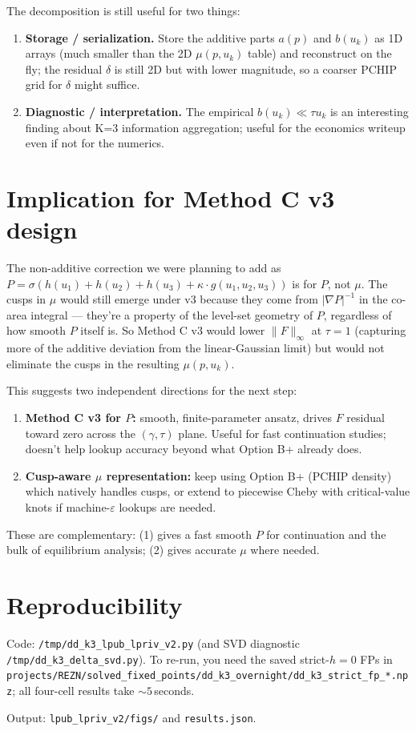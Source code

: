 \documentclass[11pt]{article}
\begin{document}
The decomposition is still useful for two things:
\begin{enumerate}\itemsep1pt
  \item \textbf{Storage / serialization.} Store the additive parts
        $a(p)$ and $b(u_k)$ as 1D arrays (much smaller than the 2D
        $\mu(p, u_k)$ table) and reconstruct on the fly; the
        residual $\delta$ is still 2D but with lower magnitude, so
        a coarser PCHIP grid for $\delta$ might suffice.
  \item \textbf{Diagnostic / interpretation.} The empirical
        $b(u_k) \ll \tau u_k$ is an interesting finding about K=3
        information aggregation; useful for the economics writeup
        even if not for the numerics.
\end{enumerate}

\section{Implication for Method C v3 design}

The non-additive correction we were planning to add as
$P = \sigma(h(u_1) + h(u_2) + h(u_3) + \kappa \cdot g(u_1, u_2, u_3))$
is for $P$, not $\mu$. The cusps in $\mu$ would still emerge under
v3 because they come from $|\nabla P|^{-1}$ in the co-area integral
--- they're a property of the level-set geometry of $P$, regardless
of how smooth $P$ itself is. So Method C v3 would lower
$\|F\|_\infty$ at $\tau = 1$ (capturing more of the additive
deviation from the linear-Gaussian limit) but would not eliminate
the cusps in the resulting $\mu(p, u_k)$.

This suggests two independent directions for the next step:
\begin{enumerate}\itemsep1pt
  \item \textbf{Method C v3 for $P$:} smooth, finite-parameter
        ansatz, drives $F$ residual toward zero across the
        $(\gamma, \tau)$ plane. Useful for fast continuation
        studies; doesn't help lookup accuracy beyond what
        Option B+ already does.
  \item \textbf{Cusp-aware $\mu$ representation:} keep using
        Option B+ (PCHIP density) which natively handles cusps, or
        extend to piecewise Cheby with critical-value knots if
        machine-$\varepsilon$ lookups are needed.
\end{enumerate}

These are complementary: (1) gives a fast smooth $P$ for continuation
and the bulk of equilibrium analysis; (2) gives accurate $\mu$ where
needed.

\section{Reproducibility}

Code: \texttt{/tmp/dd\_k3\_lpub\_lpriv\_v2.py} (and SVD diagnostic
\texttt{/tmp/dd\_k3\_delta\_svd.py}). To re-run, you need the saved
strict-$h{=}0$ FPs in
\texttt{projects/REZN/solved\_fixed\_points/dd\_k3\_overnight/dd\_k3\_strict\_fp\_*.npz};
all four-cell results take $\sim 5$\,seconds.

Output: \texttt{lpub\_lpriv\_v2/figs/} and \texttt{results.json}.
\end{document}
